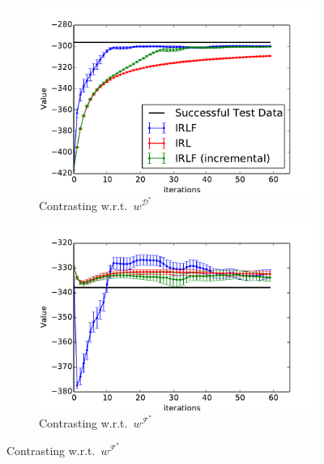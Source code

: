 \documentclass{aamas2016}
\begin{document}
\begin{figure}[t]
  \centering
  \begin{subfigure}[b]{0.45\columnwidth}
    \includegraphics[trim=0.5cm 0.5cm 0.5cm 0,clip=true,width=\textwidth]{images/expert_apprentice_contrastive.pdf}

    
    \caption{Contrasting w.r.t.\ $w^{\mathcal{D}^*}$}
    \label{fig:toy_expert_apprentice_contrastive}
  \end{subfigure}
  \hfill
  \begin{subfigure}[b]{0.45\columnwidth}
    \includegraphics[trim=0.5cm 0.5cm 0.5cm 0,clip=true,width=\textwidth]{images/taboo_apprentice_contrastive.pdf}

    
    \caption{Contrasting w.r.t.\ $w^{\mathcal{F}^*}$}
    \label{fig:toy_taboo_apprentice_contrastive}
  \end{subfigure}  
  \label{fig:contrastive}



\end{figure}
\end{document}
